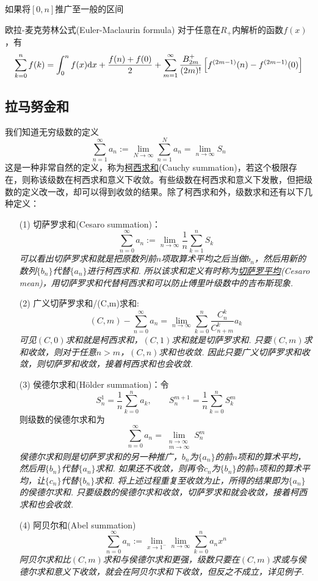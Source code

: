 \documentclass[main.tex]{subfiles}
\begin{document}
如果将\([0,n]\)推广至一般的区间
\begin{theorem}{欧拉-麦克劳林公式(Euler-Maclaurin formula)}
    对于任意在\(R_+\)内解析的函数\(f(x)\)，有
    \[\sum_{k=0}^{n}f(k) = \int_0^nf(x){\rm d}x + \frac{f(n)+f(0)}{2} + \sum_{m=1}^{\infty}\frac{B_{2m}^+}{(2m)!}\left[f^{(2m-1)}(n) - f^{(2m-1)}(0)\right]\]
\end{theorem}

\subsection{拉马努金和}

我们知道无穷级数的定义
\[ \sum_{n=1}^{\infty}a_n := \lim_{N \to \infty}\sum_{n=1}^{N}a_n = \lim_{n \to \infty}S_n\]
这是一种非常自然的定义，称为\uline{柯西求和}(Cauchy summation)，若这个极限存在，则称该级数在柯西求和意义下收敛。有些级数在柯西求和意义下发散，但把级数的定义改一改，却可以得到收敛的结果。除了柯西求和外，级数求和还有以下几种定义：
\begin{itemize}
    \item[(1)] 切萨罗求和(Cesaro summation)：
    \[ \sum_{n=0}^{\infty}a_n := \lim_{n \to \infty} \frac{1}{n}\sum_{k=1}^{n}S_k\]
    \textit{
        可以看出切萨罗求和就是把原数列前\(n\)项取算术平均之后当做\(b_n\)，然后用新的数列\(\{b_n\}\)代替\(\{a_n\}\)进行柯西求和. 所以该求和定义有时称为\uline{切萨罗平均}(Cesaro mean)，用切萨罗求和代替柯西求和可以防止傅里叶级数中的吉布斯现象.
    }
    \item[(2)] 广义切萨罗求和/(C,m)求和:
    \[ (C,m) - \sum_{n=0}^{\infty}a_n = \lim_{n \to \infty}\sum_{k=0}^{n}\frac{C_n^k}{C_{n+m}^k}a_k\]
    \textit{
        可见\((C,0)\)求和就是柯西求和，\((C,1)\)求和就是切萨罗求和. 只要\((C,m)\)求和收敛，则对于任意\(n>m\)，\((C,n)\)求和也收敛. 因此只要广义切萨罗求和收敛，则切萨罗和收敛，接着柯西求和也会收敛.
    }
    \item[(3)] 侯德尔求和(Hölder summation)：令
    \[S_n^1 = \frac{1}{n}\sum_{k=0}^{n}a_k, \qquad S_n^{m+1} = \frac{1}{n}\sum_{k=0}^{n}S_{k}^{m}\] 
    则级数的侯德尔求和为
    \[\sum_{n=0}^{\infty}a_n = \lim_{\substack{n \to \infty \\ m \to \infty}}S_{n}^{m}\]
    \textit{
        侯德尔求和则是切萨罗求和的另一种推广，\(b_n\)为\(\{a_n\}\)的前\(n\)项和的算术平均，然后用\(\{b_n\}\)代替\(\{a_n\}\)求和. 如果还不收敛，则再令\(c_n\)为\(\{b_n\}\)的前\(n\)项和的算术平均，让\(\{c_n\}\)代替\(\{b_n\}\)求和. 将上述过程重复至收敛为止，所得的结果即为\(\{a_n\}\)的侯德尔求和. 只要级数的侯德尔求和收敛，切萨罗求和就会收敛，接着柯西求和也会收敛.
    }
    \item[(4)] 阿贝尔和(Abel summation)
    \[ \sum_{n=0}^{\infty}a_n := \lim_{x \to 1^-}\lim_{n \to \infty}\sum_{k=0}^{n}a_nx^n\]
    \textit{
        阿贝尔求和比\((C,m)\)求和与侯德尔求和更强，级数只要在\((C,m)\)求或与侯德尔求和意义下收敛，就会在阿贝尔求和下收敛，但反之不成立，详见例子.
    }
\end{itemize}
\end{document}
